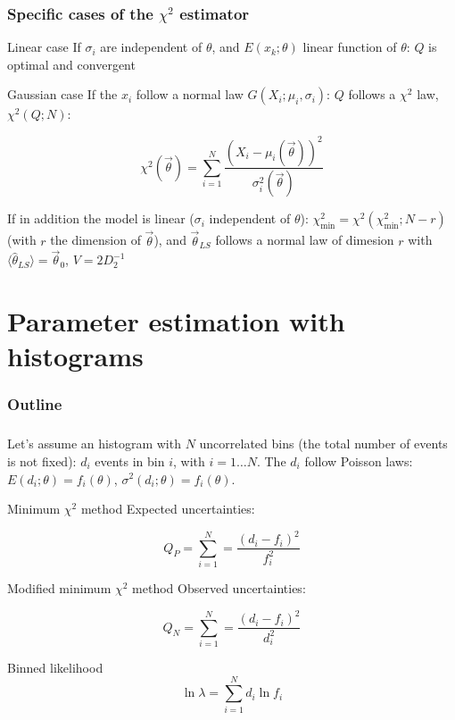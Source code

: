 \documentclass[9pt]{beamer}
\begin{document}
\begin{frame}
 \frametitle{Specific cases of the $\chi^2$ estimator}
 
 \begin{block}{Linear case}
  If $\sigma_i$ are independent of $\theta$, and $E(x_k;\theta)$ linear function of $\theta$: $Q$ is optimal and convergent
 \end{block}
 
 \begin{block}{Gaussian case}
  If the $x_i$ follow a normal law $G(X_i;\mu_i,\sigma_i)$: $Q$ follows a $\chi^2$ law, $\chi^2(Q;N)$:
  
  $$\chi^2(\vec{\theta}) = \sum_{i=1}^N \frac{\left( X_i - \mu_i (\vec{\theta})\right)^2}{\sigma_i^2 (\vec{\theta})}$$
  
  If in addition the model is linear ($\sigma_i$ independent of $\theta$): $\chi^2_\text{min} = \chi^2 (\chi^2_\text{min};N-r)$ (with $r$ the dimension of $\vec{\theta}$), and $\vec{\theta}_{LS}$ follows a normal law of dimesion $r$ with $\langle \hat{\theta}_{LS}\rangle = \vec{\theta}_0$, $V = 2 D_2^{-1}$
  
 \end{block}


\end{frame}

\section{Parameter estimation with histograms}

\begin{frame}
 \frametitle{Outline}
 
 \tableofcontents[current]
\end{frame}

\begin{frame}
 \frametitle{}
 
 Let's assume an histogram with $N$ uncorrelated bins (the total number of events is not fixed): $d_i$ events in bin $i$, with $i = 1 \dots N$. The $d_i$ follow Poisson laws: $E(d_i;\theta) = f_i(\theta)$,
 $\sigma^2(d_i;\theta) = f_i(\theta)$.
 
 \begin{block}{Minimum $\chi^2$ method}
 Expected uncertainties: 
 
  $$Q_P = \sum_{i=1}^N = \frac{\left(d_i - f_i\right)^2}{f_i^2}$$
 \end{block}
 
 \begin{block}{Modified minimum $\chi^2$ method}
 Observed uncertainties:
 
  $$Q_N = \sum_{i=1}^N = \frac{\left(d_i - f_i\right)^2}{d_i^2}$$
 \end{block}
 
 \begin{block}{Binned likelihood}
  $$\ln \lambda = \sum_{i=1}^N d_i \ln f_i$$
 \end{block}



\end{frame}
\end{document}
